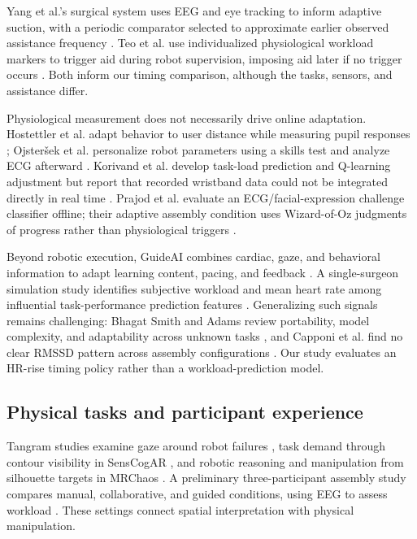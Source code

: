 \documentclass[sigconf,anonymous]{aamas}
\begin{document}
Yang et al.'s surgical system uses EEG and eye tracking to inform adaptive suction, with a periodic comparator selected to approximate earlier observed assistance frequency \cite{yang2024}. Teo et al. use individualized physiological workload markers to trigger aid during robot supervision, imposing aid later if no trigger occurs \cite{teo2018}. Both inform our timing comparison, although the tasks, sensors, and assistance differ.

Physiological measurement does not necessarily drive online adaptation. Hostettler et al. adapt behavior to user distance while measuring pupil responses \cite{hostettler2025}; Ojsteršek et al. personalize robot parameters using a skills test and analyze ECG afterward \cite{ojstersek2024}. Korivand et al. develop task-load prediction and Q-learning adjustment but report that recorded wristband data could not be integrated directly in real time \cite{korivand2024}. Prajod et al. evaluate an ECG/facial-expression challenge classifier offline; their adaptive assembly condition uses Wizard-of-Oz judgments of progress rather than physiological triggers \cite{prajod2024}.

Beyond robotic execution, GuideAI combines cardiac, gaze, and behavioral information to adapt learning content, pacing, and feedback \cite{shukla2026}. A single-surgeon simulation study identifies subjective workload and mean heart rate among influential task-performance prediction features \cite{wei2025}. Generalizing such signals remains challenging: Bhagat Smith and Adams review portability, model complexity, and adaptability across unknown tasks \cite{bhagatsmith2026}, and Capponi et al. find no clear RMSSD pattern across assembly configurations \cite{capponi2024}. Our study evaluates an HR-rise timing policy rather than a workload-prediction model.

\subsection{Physical tasks and participant experience}

Tangram studies examine gaze around robot failures \cite{tabatabaei2025}, task demand through contour visibility in SensCogAR \cite{melo2026}, and robotic reasoning and manipulation from silhouette targets in MRChaos \cite{zhao2025}. A preliminary three-participant assembly study compares manual, collaborative, and guided conditions, using EEG to assess workload \cite{caiazzo2024}. These settings connect spatial interpretation with physical manipulation.
\end{document}
